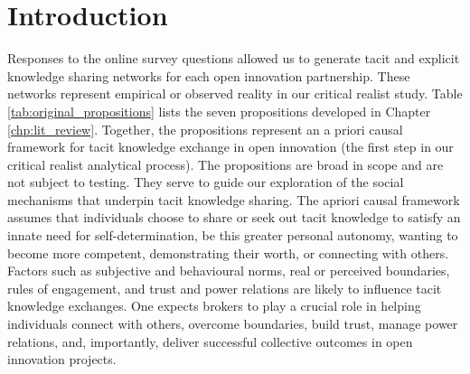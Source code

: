 \section{Introduction} 

Responses to the online survey questions allowed us to generate tacit and explicit knowledge sharing networks for each open innovation partnership. These networks represent empirical or observed reality in our critical realist study. Table \ref{tab:original_propositions} lists the seven propositions developed in Chapter \ref{chp:lit_review}. Together, the propositions represent an a priori causal framework for tacit knowledge exchange in open innovation (the first step in our critical realist analytical process). The propositions are broad in scope and are not subject to testing. They serve to guide our exploration of the social mechanisms that underpin tacit knowledge sharing. The apriori causal framework assumes that individuals choose to share or seek out tacit knowledge to satisfy an innate need for self-determination, be this greater personal autonomy, wanting to become more competent, demonstrating their worth, or connecting with others. Factors such as subjective and behavioural norms, real or perceived boundaries, rules of engagement, and trust and power relations are likely to influence tacit knowledge exchanges. One expects brokers to play a crucial role in helping individuals connect with others, overcome boundaries, build trust, manage power relations, and, importantly, deliver successful collective outcomes in open innovation projects. \medskip

\begin{table}[hbt!]
\centering
\caption{Original list of propositions.}
\label{tab:original_propositions}
\end{table}

